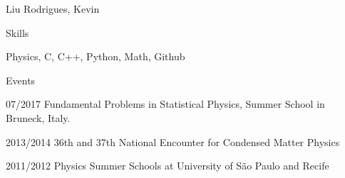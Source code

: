 \documentclass[12pt,a4paper]{article}
\begin{document}
\begin{cv}{Liu Rodrigues, Kevin}
  \begin{cvlist}{Skills}
  \item[] Physics, C, C++, Python, Math, Github
  \end{cvlist}

  \begin{cvlist}{Events}
  \item[07/2017] Fundamental Problems in Statistical Physics, Summer School in Bruneck, Italy.
  \item[2013/2014] 36th and 37th National Encounter for Condensed Matter Physics 
  \item[2011/2012] Physics Summer Schools at University of São Paulo and Recife
  \end{cvlist}

\end{cv}
\end{document}
